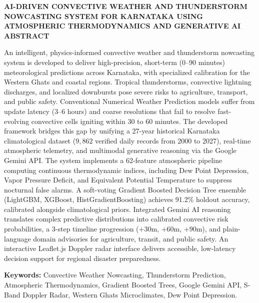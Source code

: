 \documentclass[12pt,a4paper]{report}
\begin{document}
\setcounter{page}{1}
\thispagestyle{empty}

\begin{center}
{\fontsize{15pt}{19pt}\selectfont \textbf{AI-DRIVEN CONVECTIVE WEATHER AND THUNDERSTORM NOWCASTING SYSTEM FOR KARNATAKA USING ATMOSPHERIC THERMODYNAMICS AND GENERATIVE AI}}\\[0.5cm]
{\fontsize{14pt}{18pt}\selectfont \textbf{ABSTRACT}}\\[0.5cm]
\end{center}

\noindent An intelligent, physics-informed convective weather and thunderstorm nowcasting system is developed to deliver high-precision, short-term ($0$--$90$ minutes) meteorological predictions across Karnataka, with specialized calibration for the Western Ghats and coastal regions. Tropical thunderstorms, convective lightning discharges, and localized downbursts pose severe risks to agriculture, transport, and public safety. Conventional Numerical Weather Prediction models suffer from update latency ($3$--$6$ hours) and coarse resolutions that fail to resolve fast-evolving convective cells igniting within $30$ to $60$ minutes. The developed framework bridges this gap by unifying a 27-year historical Karnataka climatological dataset ($9,862$ verified daily records from 2000 to 2027), real-time atmospheric telemetry, and multimodal generative reasoning via the Google Gemini API. The system implements a 62-feature atmospheric pipeline computing continuous thermodynamic indices, including Dew Point Depression, Vapor Pressure Deficit, and Equivalent Potential Temperature to suppress nocturnal false alarms. A soft-voting Gradient Boosted Decision Tree ensemble (LightGBM, XGBoost, HistGradientBoosting) achieves 91.2\% holdout accuracy, calibrated alongside climatological priors. Integrated Gemini AI reasoning translates complex predictive distributions into calibrated convective risk probabilities, a 3-step timeline progression ($+30$m, $+60$m, $+90$m), and plain-language domain advisories for agriculture, transit, and public safety. An interactive Leaflet.js Doppler radar interface delivers accessible, low-latency decision support for regional disaster preparedness.

\vspace{0.8cm}
\noindent \textbf{Keywords:} Convective Weather Nowcasting, Thunderstorm Prediction, Atmospheric Thermodynamics, Gradient Boosted Trees, Google Gemini API, S-Band Doppler Radar, Western Ghats Microclimates, Dew Point Depression.
\newpage
\tableofcontents
\thispagestyle{empty}
\end{document}
